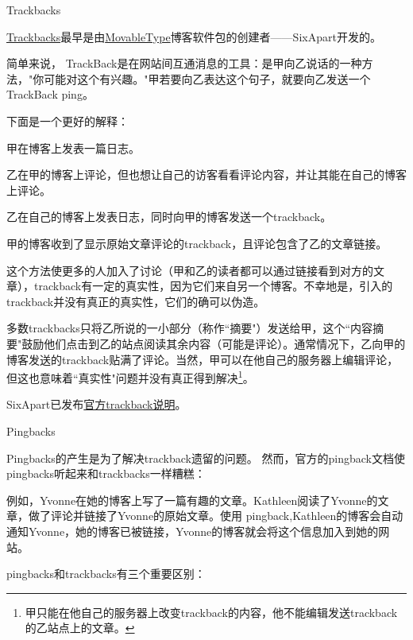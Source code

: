 \begin{compactenum}
\item Trackbacks

\href{http://codex.wordpress.org/Glossary#Trackback}{Trackbacks}最早是由\href{http://www.movabletype.org/}{MovableType}博客软件包的创建者——SixApart开发的。
\begin{shaded}
简单来说， TrackBack是在网站间互通消息的工具：是甲向乙说话的一种方法，"你可能对这个有兴趣。"甲若要向乙表达这个句子，就要向乙发送一个 TrackBack ping。
\end{shaded}

下面是一个更好的解释：
\begin{compactitem}
\item 甲在博客上发表一篇日志。
\item 乙在甲的博客上评论，但也想让自己的访客看看评论内容，并让其能在自己的博客上评论。
\item 乙在自己的博客上发表日志，同时向甲的博客发送一个trackback。
\item 甲的博客收到了显示原始文章评论的trackback，且评论包含了乙的文章链接。
\end{compactitem}

这个方法使更多的人加入了讨论（甲和乙的读者都可以通过链接看到对方的文章），trackback有一定的真实性，因为它们来自另一个博客。不幸地是，引入的trackback并没有真正的真实性，它们的确可以伪造。

多数trackbacks只将乙所说的一小部分（称作``摘要"）发送给甲，这个``内容摘要"鼓励他们点击到乙的站点阅读其余内容（可能是评论）。通常情况下，乙向甲的博客发送的trackback贴满了评论。当然，甲可以在他自己的服务器上编辑评论，但这也意味着``真实性"问题并没有真正得到解决\footnote{甲只能在他自己的服务器上改变trackback的内容，他不能编辑发送trackback的乙站点上的文章。}。

SixApart已发布\href{http://www.movabletype.org/docs/mttrackback.html}{官方trackback说明}。

\item Pingbacks

Pingbacks的产生是为了解决trackback遗留的问题。 然而，官方的pingback文档使pingbacks听起来和trackbacks一样糟糕：
\begin{shaded}
例如，Yvonne在她的博客上写了一篇有趣的文章。Kathleen阅读了Yvonne的文章，做了评论并链接了Yvonne的原始文章。使用 pingback,Kathleen的博客会自动通知Yvonne，她的博客已被链接，Yvonne的博客就会将这个信息加入到她的网站。	
\end{shaded}

pingbacks和trackbacks有三个重要区别：


\end{compactenum}
